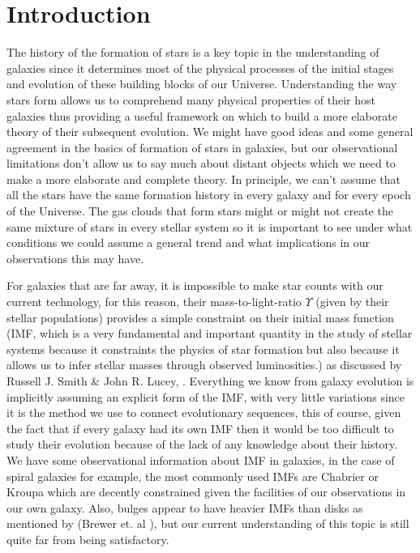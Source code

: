\chapter{Introduction}

The history of the formation of stars is a key topic in the understanding of galaxies since it determines most of the physical processes of the initial stages and evolution of these building blocks of our Universe. Understanding the way stars form allows us to comprehend many physical properties of their host galaxies thus providing a useful framework on which to build a more elaborate theory of their subsequent evolution. We might have good ideas and some general agreement in the basics of formation of stars in galaxies, but our observational limitations don't allow us to say much about distant objects which we need to make a more elaborate and complete theory. In principle, we can't assume that all the stars have the same formation history in every galaxy and for every epoch of the Universe. The gas clouds that form stars might or might not create the same mixture of stars in every stellar system so it is important to see under what conditions we could assume a general trend and what implications in our observations this may have.

For galaxies that are far away, it is impossible to make star counts with our current technology, for this reason, their mass-to-light-ratio $\Upsilon$ (given by their stellar populations) provides a simple constraint on their initial mass function (IMF, which is a very fundamental and important quantity in the study of stellar systems because it constraints the physics of star formation but also because it allows us to infer stellar masses through observed luminosities.) as discussed by Russell J. Smith \& John R. Lucey, \citeyear{Reference7}. Everything we know from galaxy evolution is implicitly assuming an explicit form of the IMF, with very little variations since it is the method we use to connect evolutionary sequences, this of course, given the fact that if every galaxy had its own IMF then it would be too difficult to study their evolution because of the lack of any knowledge about their history. We have some observational information about IMF in galaxies, in the case of spiral galaxies for example, the most commonly used IMFs are Chabrier or Kroupa which are decently constrained given the facilities of our observations in our own galaxy. Also, bulges appear to have heavier IMFs than disks as mentioned by (Brewer et. al \citeyear{Reference16}), but our current understanding of this topic is still quite far from being satisfactory.


